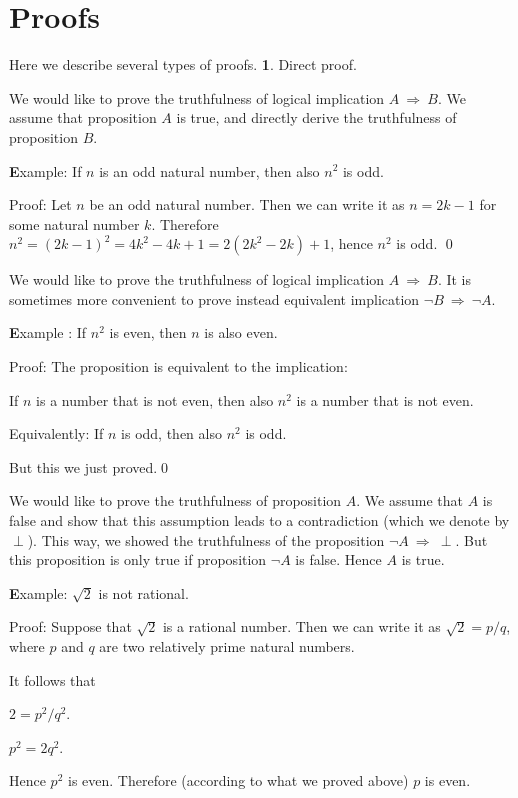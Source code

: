 \documentclass[11pt,paper=b5,footinclude,headinclude]{scrbook} %
\def\sledi {{~\Rightarrow~}}
\theoremstyle{remark}
\theoremstyle{definition} %
\begin{document}
\section{Proofs}
Here we describe several types of proofs.
{\textbf 1. Direct proof.}

We would like to prove the truthfulness of logical implication $A \sledi  B$.
We assume that proposition $A$ is true, and directly derive the truthfulness of proposition $B$.


\medskip
{\textbf Example:}
If $n$ is an odd natural number, then also $n^2$ is odd.

Proof: Let $n$ be an odd natural number.
Then we can write it as $n = 2k-1$ for some natural number $k$.
Therefore $n^2 = (2k-1)^2 = 4k^2-4k+1 = 2(2k^2-2k)+1$, hence  $n^2$ is odd. \qed

\medskip
{}

We would like to prove the truthfulness of  logical implication $A \sledi  B$. It is sometimes more convenient to
prove instead equivalent implication $\neg B \sledi \neg A$.

\medskip
{\textbf Example :} If  $n^2$ is even, then $n$ is also even.

Proof: The proposition is equivalent to the implication:

If $n$ is a number that is not even, then also $n^2$ is a number that is not even.

Equivalently: If $n$ is odd, then also $n^2$ is odd.

But this we just proved.\qed

\medskip
{}

We would like to prove the truthfulness of proposition $A$.
We assume that $A$ is false and show that this assumption leads to a contradiction (which we denote by $\perp$).
This way, we showed the truthfulness of the proposition $\neg A \sledi \perp$. But this proposition is only true if proposition $\neg A$ is false. Hence $A$ is true.

\medskip
{\textbf Example:} $\sqrt 2$ is not rational.

Proof: Suppose that $\sqrt 2$ is a rational number. Then we can write it as $\sqrt 2 = p/q$, where $p$ and $q$ are
two relatively prime natural numbers.

It follows that

$2 = p^2/q^2$.

$p^2 = 2q^2$.

Hence $p^2$ is even. Therefore (according to what we proved above) $p$ is even.
\end{document}
